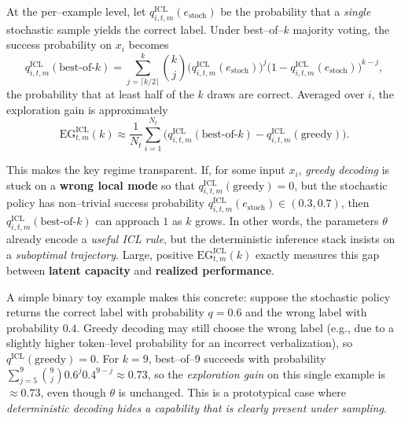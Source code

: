 At the per--example level, let
$q^{\text{ICL}}_{i,t,m}(e_{\text{stoch}})$ be the probability that a
\emph{single} stochastic sample yields the correct label. Under
best--of--$k$ majority voting, the success probability on $x_i$ becomes
\[
q^{\text{ICL}}_{i,t,m}(\text{best-of-}k)
= \sum_{j=\lceil k/2 \rceil}^{k}
  \binom{k}{j}
  \big(q^{\text{ICL}}_{i,t,m}(e_{\text{stoch}})\big)^{j}
  \big(1 - q^{\text{ICL}}_{i,t,m}(e_{\text{stoch}})\big)^{k-j},
\]
the probability that at least half of the $k$ draws are correct. Averaged
over $i$, the exploration gain is approximately
\[
\mathrm{EG}^{\text{ICL}}_{t,m}(k)
\approx \frac{1}{N_t} \sum_{i=1}^{N_t}
\Big( q^{\text{ICL}}_{i,t,m}(\text{best-of-}k)
    - q^{\text{ICL}}_{i,t,m}(\text{greedy}) \Big).
\]

This makes the key regime transparent. If, for some input $x_i$,
\emph{greedy decoding} is stuck on a \textbf{wrong local mode} so that
$q^{\text{ICL}}_{i,t,m}(\text{greedy}) = 0$, but the stochastic policy has
non--trivial success probability
$q^{\text{ICL}}_{i,t,m}(e_{\text{stoch}}) \in (0.3,0.7)$, then
$q^{\text{ICL}}_{i,t,m}(\text{best-of-}k)$ can approach $1$ as $k$
grows. In other words, the parameters $\theta$ already encode a
\emph{useful ICL rule}, but the deterministic inference stack insists on a
\emph{suboptimal trajectory}. Large, positive
$\mathrm{EG}^{\text{ICL}}_{t,m}(k)$ exactly measures this gap between
\textbf{latent capacity} and \textbf{realized performance}.

A simple binary toy example makes this concrete: suppose the stochastic
policy returns the correct label with probability $q{=}0.6$ and the wrong
label with probability $0.4$. Greedy decoding may still choose the wrong
label (e.g., due to a slightly higher token--level probability for an
incorrect verbalization), so $q^{\text{ICL}}(\text{greedy}){=}0$. For $k{=}9$,
best--of--$9$ succeeds with probability
$\sum_{j=5}^{9} \binom{9}{j} 0.6^{j} 0.4^{9-j} \approx 0.73$, so the
\emph{exploration gain} on this single example is $\approx 0.73$, even
though $\theta$ is unchanged. This is a prototypical case where
\emph{deterministic decoding hides a capability that is clearly present
under sampling}.

\vspace{0.3em}
